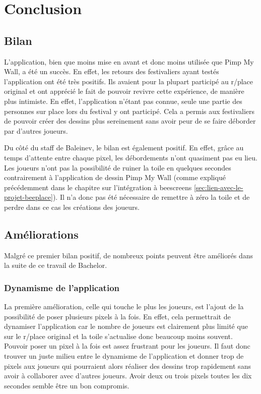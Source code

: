 \section{Conclusion}

\subsection{Bilan}

L'application, bien que moins mise en avant et donc moins utilisée que Pimp My Wall, a été un succès. En effet, les retours des festivaliers ayant testés l'application ont été très positifs. Ils avaient pour la plupart participé au r/place original et ont apprécié le fait de pouvoir revivre cette expérience, de manière plus intimiste. En effet, l'application n'étant pas connue, seule une partie des personnes sur place lors du festival y ont participé. Cela a permis aux festivaliers de pouvoir créer des dessins plus sereinement sans avoir peur de se faire déborder par d'autres joueurs.

Du côté du staff de Baleinev, le bilan est également positif. En effet, grâce au temps d'attente entre chaque pixel, les débordements n'ont quasiment pas eu lieu. Les joueurs n'ont pas la possibilité de ruiner la toile en quelques secondes contrairement à l'application de dessin Pimp My Wall (comme expliqué précédemment dans le chapitre sur l'intégration à \gls{beescreens} \ref{sec:lien-avec-le-projet-beeplace}). Il n'a donc pas été nécessaire de remettre à zéro la toile et de perdre dans ce cas les créations des joueurs.

\subsection{Améliorations}
\label{poc-ameliorations}

Malgré ce premier bilan positif, de nombreux points peuvent être améliorés dans la suite de ce travail de Bachelor.

\subsubsection{Dynamisme de l'application}
La première amélioration, celle qui touche le plus les joueurs, est l'ajout de la possibilité de poser plusieurs pixels à la fois. En effet, cela permettrait de dynamiser l'application car le nombre de joueurs est clairement plus limité que sur le r/place original et la toile s'actualise donc beaucoup moins souvent. Pouvoir poser un pixel à la fois est assez frustrant pour les joueurs. Il faut donc trouver un juste milieu entre le dynamisme de l'application et donner trop de pixels aux joueurs qui pourraient alors réaliser des dessins trop rapidement sans avoir à collaborer avec d'autres joueurs. Avoir deux ou trois pixels toutes les dix secondes semble être un bon compromis.

